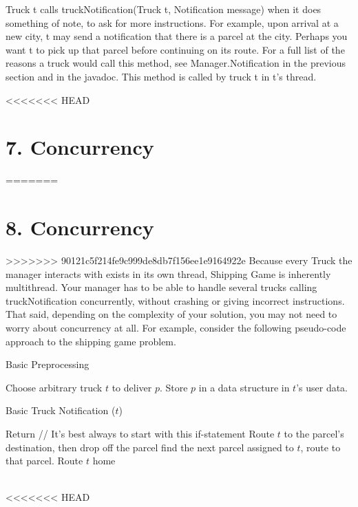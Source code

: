 \documentclass[11pt]{article}
\begin{document}
\begin{itemize}
Truck t calls truckNotification(Truck t, Notification message) when it does something of note, to ask for more instructions. For example, upon arrival at a new city, t may send a notification that there is a parcel at the city. Perhaps you want t to pick up that parcel before continuing on its route. For a full list of the reasons a truck would call this method, see Manager.Notification in the previous section and in the javadoc. This method is called by truck t in t's thread. 

<<<<<<< HEAD
\section{7. Concurrency}
=======

\section{8. Concurrency}
>>>>>>> 90121c5f214fe9c999de8db7f156ee1e9164922e
Because every Truck the manager interacts with exists in its own thread, Shipping Game is inherently multithread. Your manager has to be able to handle several trucks calling truckNotification concurrently, without crashing or giving incorrect instructions. That said, depending on the complexity of your solution, you may not need to worry about concurrency at all. For example, consider the following pseudo-code approach to the shipping game problem.
\begin{algorithm}
\caption{Basic Preprocessing} \label{alg:ls}
\begin{algorithmic}[1]
\STATE Choose arbitrary truck $t$ to deliver $p$. Store $p$ in a data structure in $t$'s user data.
\ENDFOR
\end{algorithmic}
\end{algorithm}
\begin{algorithm}
\caption{Basic Truck Notification ($t$)} \label{alg:ls}
\begin{algorithmic}[1]
\STATE Return      // It's best always to start with this if-statement
\ENDIF
{}
\STATE Route $t$ to the parcel's destination, then drop off the parcel
\ELSE
\STATE find the next parcel assigned to $t$, route to that parcel.
\ENDIF
\ELSE
\STATE Route $t$ home
\ENDIF
\end{algorithmic}
\end{algorithm}
\\
<<<<<<< HEAD


\end{itemize}
\end{document}
